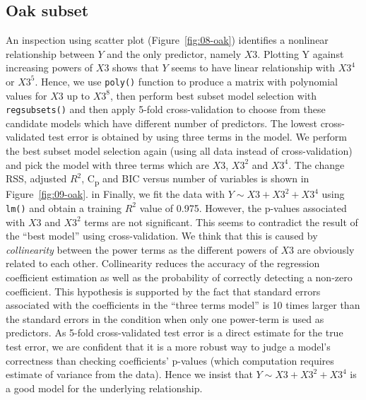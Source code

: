 \documentclass{article}
\begin{document}
\subsection{Oak subset}

An inspection using scatter plot (Figure~\ref{fig:08-oak}) identifies a nonlinear relationship between $Y$ and the only predictor, namely $X3$. Plotting Y against increasing powers of $X3$ shows that $Y$ seems to have linear relationship with $X3^4$ or $X3^5$. Hence, we use {\tt poly()} function to produce a matrix with polynomial values for $X3$ up to $X3^8$, then perform best subset model selection with {\tt regsubsets()} and then apply 5-fold cross-validation to choose from these candidate models which have different number of predictors. The lowest cross-validated test error is obtained by using three terms in the model. We perform the best subset model selection again (using all data instead of cross-validation) and pick the model with three terms which are $X3$, $X3^2$ and $X3^4$. The change RSS, adjusted $R^2$, C\textsubscript{p} and BIC versus number of variables is shown in Figure~\ref{fig:09-oak}. in Finally, we fit the data with $Y \sim X3+X3^2+X3^4$ using {\tt lm()} and obtain a training $R^2$ value of 0.975. However, the p-values associated with $X3$ and $X3^2$ terms are not significant. This seems to contradict the result of the ``best model'' using cross-validation. We think that this is caused by {\em collinearity} between the power terms as the different powers of $X3$ are obviously related to each other. Collinearity reduces the accuracy of the regression coefficient estimation as well as the probability of correctly detecting a non-zero coefficient. This hypothesis is supported by the fact that standard errors associated with the coefficients in the ``three terms model'' is 10 times larger than the standard errors in the condition when only one power-term is used as predictors. As 5-fold cross-validated test error is a direct estimate for the true test error, we are confident that it is a more robust way to judge a model's correctness than checking coefficients' p-values (which computation requires estimate of variance from the data). Hence we insist that $Y \sim X3+X3^2+X3^4$ is a good model for the underlying relationship.
\end{document}

